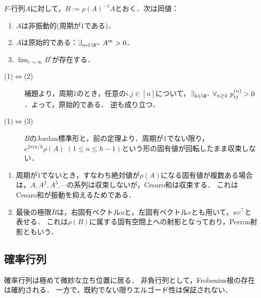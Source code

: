 \documentclass[uplatex, dvipdfmx]{jsreport}
\begin{document}
\begin{theorem}[$F$-行列の極限の存在条件]\label{thm-limit-of-nonnegative-matrix}
    $F$-行列$A$に対して，$B:=\rho(A)^{-1}A$とおく．次は同値：
    \begin{enumerate}
        \item $A$は非振動的(周期が1である)．
        \item $A$は原始的である：$\exists_{m\in\N^+}\;A^m>0$．
        \item $\lim_{i\to\infty}B^i$が存在する．
    \end{enumerate}
\end{theorem}
\begin{Proof}\mbox{}
    \begin{description}
        \item[(1)$\Leftrightarrow$(2)] 補題より，周期1のとき，任意の$i.j\in[n]$について，$\exists_{k\in\N^+}\;\forall_{n\ge k}\;p_{ij}^{(n)}>0$．よって，原始的である．
        逆も成り立つ．
        \item[(1)$\Leftrightarrow$(3)] $B$のJordan標準形と，前の定理より．周期が$1$でない限り，$e^{2\pi in/h}\rho(A)\;(1\le n\le h-1)$という形の固有値が回転したまま収束しない．
    \end{description}
\end{Proof}
\begin{remarks}\mbox{}
    \begin{enumerate}
        \item 周期が1でないとき，すなわち絶対値が$\rho(A)$になる固有値が複数ある場合は，$A,A^2,A^3,\cdots$の系列は収束しないが，Cesaro和は収束する．
        これはCesaro和が振動を抑えるためである．
        \item 最後の極限$B$は，右固有ベクトル$u$と，左固有ベクトル$v$とも用いて，$uv^\top$と表せる．
        これは$\rho(B)$に属する固有空間上への射影となっており，Perron射影ともいう．
    \end{enumerate}
\end{remarks}

\subsection{確率行列}

\begin{tcolorbox}[colframe=ForestGreen, colback=ForestGreen!10!white,breakable,colbacktitle=ForestGreen!40!white,coltitle=black,fonttitle=\bfseries\sffamily,
title=]
    確率行列は極めて微妙な立ち位置に居る．
    非負行列として，Frobenius根の存在は確約される．
    一方で，既約でない限りエルゴード性は保証されない．
\end{tcolorbox}
\end{document}

